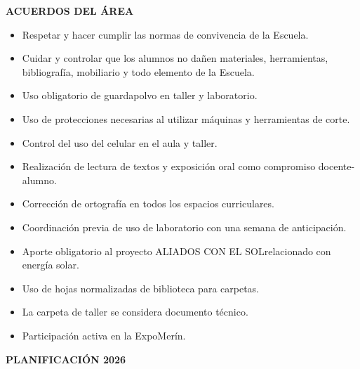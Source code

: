 \documentclass[a4paper,12pt]{article}
\begin{document}
\vspace{0.5cm}

\begin{center}\fontsize{12pt}{14pt}\selectfont
  \textbf{\uppercase{ACUERDOS DEL ÁREA}}
\end{center}
\begin{itemize}[leftmargin=*, itemsep=0pt, parsep=0pt]
  \item Respetar y hacer cumplir las normas de convivencia de la Escuela.
  \item Cuidar y controlar que los alumnos no dañen materiales,
    herramientas, bibliografía, mobiliario y todo elemento de la Escuela.
  \item Uso obligatorio de guardapolvo en taller y laboratorio.
  \item Uso de protecciones necesarias al utilizar máquinas y
    herramientas de corte.
  \item Control del uso del celular en el aula y taller.
  \item Realización de lectura de textos y exposición oral como
    compromiso docente-alumno.
  \item Corrección de ortografía en todos los espacios curriculares.
  \item Coordinación previa de uso de laboratorio con una semana de
    anticipación.
  \item Aporte obligatorio al proyecto \textquotedbl ALIADOS CON EL
    SOL\textquotedbl relacionado con energía solar.
  \item Uso de hojas normalizadas de biblioteca para carpetas.
  \item La carpeta de taller se considera documento técnico.
  \item Participación activa en la ExpoMerín.
\end{itemize}

\vspace{0.5cm}

\begin{center}
  \fontsize{12pt}{14pt}\selectfont \textbf{\uppercase{PLANIFICACIÓN 2026}}
\end{center}
\end{document}
